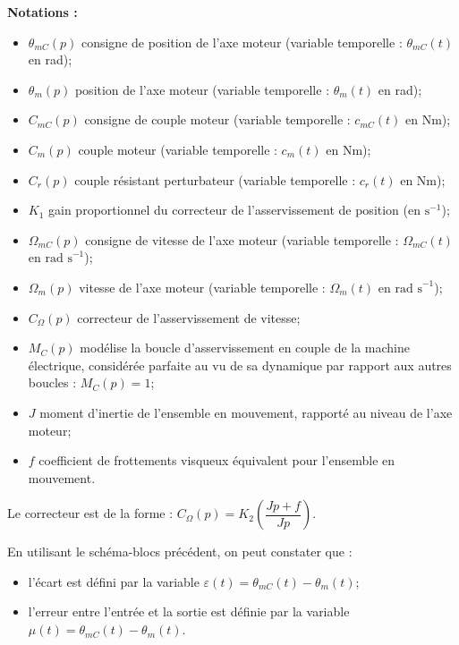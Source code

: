 \documentclass[10pt,fleqn]{article} %
\begin{document}
\begin{multicols}{2}
\textbf{Notations : }
\begin{itemize}
\item $\theta_{mC}(p)$ consigne de position de l’axe moteur (variable temporelle : $\theta_{mC}(t)$ en rad);
\item $\theta_{m}(p)$ position de l’axe moteur (variable temporelle : $\theta_{m}(t)$ en rad);
\item $C_{mC}(p)$ consigne de couple moteur (variable temporelle : $c_{mC}(t)$ en Nm);
\item $C_{m}(p)$ couple moteur (variable temporelle : $c_{m}(t)$ en Nm);
\item $C_{r}(p)$ couple résistant perturbateur (variable temporelle : $c_{r}(t)$ en Nm);
\item $K_1$ gain proportionnel du correcteur de l’asservissement de position (en $\text{s}^{-1}$);
\item $\Omega_{mC}(p)$ consigne de vitesse de l’axe moteur (variable temporelle : $\Omega_{mC}(t)$ en $\text{rad s}^{-1}$);
\item $\Omega_{m}(p)$ vitesse de l’axe moteur (variable temporelle : $\Omega_{m}(t)$ en  $\text{rad s}^{-1}$);
\item $C_{\Omega}(p)$ correcteur de l’asservissement de vitesse;
\item $M_C(p)$ modélise la boucle d’asservissement en couple de la machine électrique, considérée parfaite au vu de sa dynamique par rapport aux autres boucles : $M_C(p)=1$; 
\item $J$ moment d’inertie de l’ensemble en mouvement, rapporté au niveau de l’axe moteur;
\item $f$ coefficient de frottements visqueux équivalent pour l’ensemble en mouvement.
\end{itemize}


Le correcteur est de la forme : $C_{\Omega}(p)=K_2 \left( \dfrac{Jp +f}{Jp}\right)$. 

En utilisant le schéma-blocs précédent, on peut constater que : 
\begin{itemize}
\item l'écart est défini par la variable $\varepsilon(t) = \theta_{mC}(t)-\theta_m(t)$;
\item l'erreur entre l’entrée et la sortie est définie par la variable $\mu(t)= \theta_{mC}(t)-\theta_m(t)$.
\end{itemize}


\end{multicols}
\end{document}
